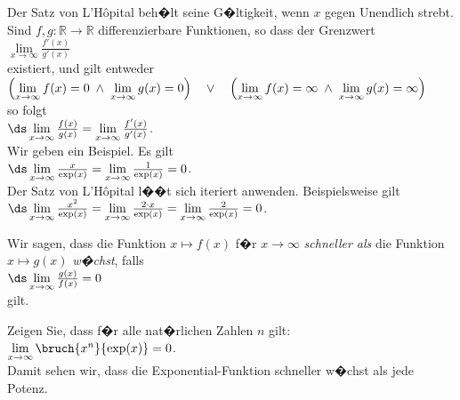 \noindent
Der Satz von L'H\^opital beh�lt seine G�ltigkeit, wenn $x$ gegen Unendlich strebt.  Sind 
$f,g:\mathbb{R} \rightarrow \mathbb{R}$ differenzierbare Funktionen, so dass der Grenzwert
\\[0.3cm]
\hspace*{1.3cm}
$\lim\limits_{x \rightarrow \infty} \frac{f'(x)}{g'(x)}$ 
\\[0.3cm]
existiert, und gilt entweder 
\\[0.3cm]
\hspace*{0.3cm}
$\Bigl(\lim\limits_{x \rightarrow \infty} f(x) = 0 \;\wedge\; \lim\limits_{x \rightarrow \infty} g(x) = 0\Bigr) \quad \vee \quad
 \Bigl(\lim\limits_{x \rightarrow \infty} f(x) = \infty \;\wedge\;\lim\limits_{x \rightarrow \infty} g(x) = \infty\Bigr)$ 
\\[0.3cm]
so folgt
\\
\hspace*{1.3cm}
$\ds\lim\limits_{x \rightarrow \infty} \frac{f(x)}{g(x)} = \lim\limits_{x \rightarrow \infty} \frac{f'(x)}{g'(x)}$.
\\[0.3cm]
Wir geben ein Beispiel.  Es gilt 
\\[0.3cm]
\hspace*{1.3cm}
$\ds\lim\limits_{x \rightarrow \infty} \frac{x}{\exp(x)} = \lim\limits_{x \rightarrow \infty} \frac{1}{\exp(x)} = 0$.
\\[0.3cm]
Der Satz von L'H\^opital l��t sich iteriert anwenden.  Beispielsweise gilt
\\[0.3cm]
\hspace*{1.3cm}
$\ds\lim\limits_{x \rightarrow \infty} \frac{x^2}{\exp(x)} = \lim\limits_{x \rightarrow \infty} \frac{2\cdot x}{\exp(x)} =\lim\limits_{x \rightarrow \infty} \frac{2}{\exp(x)} = 0$.
\vspace*{0.3cm}

\begin{Definition}
  Wir sagen, dass die Funktion $x \mapsto f(x)$ f�r $x \rightarrow \infty$ \emph{schneller als} die
  Funktion $x \mapsto g(x)$ \emph{w�chst}, falls 
  \\[0.2cm]
  \hspace*{1.3cm}
  $\ds \lim\limits_{x \rightarrow \infty} \frac{g(x)}{f(x)} = 0$
  \\[0.2cm]
  gilt. \eox
\end{Definition}

\exercise
Zeigen Sie, dass f�r alle nat�rlichen Zahlen $n$ gilt: 
\\[0.3cm]
\hspace*{1.3cm} $\lim\limits_{x \rightarrow \infty} \bruch{x^n}{\exp(x)} = 0$.
\\[0.3cm]
Damit sehen wir, dass die Exponential-Funktion schneller w�chst als jede Potenz.  
\eox

